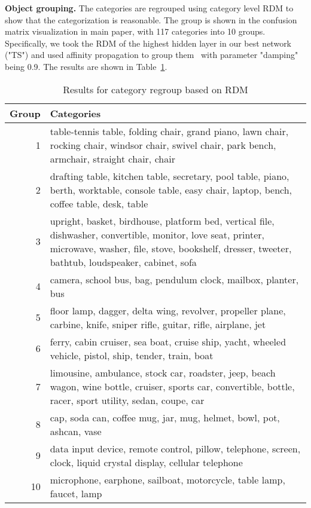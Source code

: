 \textbf{Object grouping.} The categories are regrouped using category level RDM to show that the categorization is reasonable. 
The group is shown in the confusion matrix visualization in main paper, with 117 categories into 10 groups.
Specifically, we took the RDM of the highest hidden layer in our best network ("TS") and used affinity propagation to group them~\cite{frey2007clustering} with parameter "damping" being 0.9.
The results are shown in Table~\ref{tab:cat_regruop}.

\begin{table}[h]
\caption{Results for category regroup based on RDM} %
\centering %
\begin{tabularx}{\textwidth}{r|X}
\hline\hline
Group & Categories\\ [0.5ex]
\hline
1 & table-tennis table, folding chair, grand piano, lawn chair, rocking chair, windsor chair, swivel chair, park bench, armchair, straight chair, chair\\
\hline
2 & drafting table, kitchen table, secretary, pool table, piano, berth, worktable, console table, easy chair, laptop, bench, coffee table, desk, table\\
\hline
3 & upright, basket, birdhouse, platform bed, vertical file, dishwasher, convertible, monitor, love seat, printer, microwave, washer, file, stove, bookshelf, dresser, tweeter, bathtub, loudspeaker, cabinet, sofa\\
\hline
4 & camera, school bus, bag, pendulum clock, mailbox, planter, bus\\
\hline
5 & floor lamp, dagger, delta wing, revolver, propeller plane, carbine, knife, sniper rifle, guitar, rifle, airplane, jet\\
\hline
6 & ferry, cabin cruiser, sea boat, cruise ship, yacht, wheeled vehicle, pistol, ship, tender, train, boat\\
\hline
7 & limousine, ambulance, stock car, roadster, jeep, beach wagon, wine bottle, cruiser, sports car, convertible, bottle, racer, sport utility, sedan, coupe, car\\
\hline
8 & cap, soda can, coffee mug, jar, mug, helmet, bowl, pot, ashcan, vase\\
\hline
9 & data input device, remote control, pillow, telephone, screen, clock, liquid crystal display, cellular telephone\\
\hline
10 & microphone, earphone, sailboat, motorcycle, table lamp, faucet, lamp\\
\hline
\end{tabularx}
\label{tab:cat_regruop}
\end{table}
